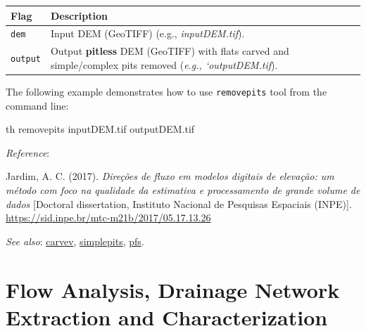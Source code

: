 \documentclass[
]{book}
\newenvironment{Shaded}{\begin{snugshade}}{\end{snugshade}}
\newcommand{\ExtensionTok}[1]{#1}
\newcommand{\NormalTok}[1]{#1}
\theoremstyle{definition}
\theoremstyle{definition}
\theoremstyle{definition}
\theoremstyle{definition}
\theoremstyle{remark}
\begin{document}
\begin{longtable}[]{@{}
  >{\raggedright\arraybackslash}p{}
  >{\raggedright\arraybackslash}p{}@{}}
\toprule\noalign{}
\begin{minipage}[b]{\linewidth}\raggedright
Flag
\end{minipage} & \begin{minipage}[b]{\linewidth}\raggedright
Description
\end{minipage} \\
\midrule\noalign{}
\endhead
\bottomrule\noalign{}
\endlastfoot
\texttt{dem} & Input DEM (GeoTIFF) (e.g., \emph{inputDEM.tif}). \\
\texttt{output} & Output \textbf{pitless} DEM (GeoTIFF) with flats carved and simple/complex pits removed (\emph{e.g., `outputDEM.tif}). \\
\end{longtable}

The following example demonstrates how to use \texttt{removepits} tool from the command line:

\begin{Shaded}
\begin{Highlighting}[]
\ExtensionTok{th}\NormalTok{ removepits inputDEM.tif outputDEM.tif}
\end{Highlighting}
\end{Shaded}

\emph{Reference}:

Jardim, A. C. (2017). \emph{Direções de fluxo em modelos digitais de elevação: um método com foco na qualidade da estimativa e processamento de grande volume de dados} {[}Doctoral dissertation, Instituto Nacional de Pesquisas Espaciais (INPE){]}. \href{http://mtc-m21b.sid.inpe.br/col/sid.inpe.br/mtc-m21b/2017/05.17.13.26/doc/publicacao.pdf?metadatarepository=sid.inpe.br/mtc-m21b/2017/05.17.13.26.57&mirror=sid.inpe.br/mtc-m21b/2013/09.26.14.25.22&languagebutton=en}{https://sid.inpe.br/mtc-m21b/2017/05.17.13.26}

\emph{See also}: \hyperref[carvev]{carvev}, \hyperref[simplepits]{simplepits}, \hyperref[pfs]{pfs}.

\section{Flow Analysis, Drainage Network Extraction and Characterization}\label{Flow-Analysis-Drainage-Network-Extraction-and-Characterization}
\end{document}
